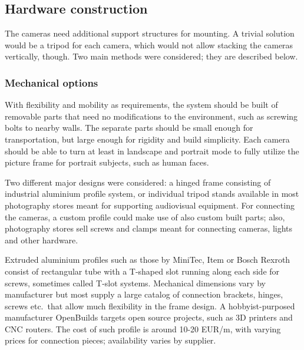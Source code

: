 

\subsection{Hardware construction} %

The cameras need additional support structures for mounting.
A trivial solution would be a tripod for each camera, which would not allow stacking the cameras vertically, though.
Two main methods were considered; they are described below.

\subsubsection{Mechanical options}

With flexibility and mobility as requirements, the system should be built of removable parts that need no modifications to the environment, such as screwing bolts to nearby walls.
The separate parts should be small enough for transportation, but large enough for rigidity and build simplicity.
Each camera should be able to turn at least in landscape and portrait mode to fully utilize the picture frame for portrait subjects, such as human faces.

Two different major designs were considered: a hinged frame consisting of industrial aluminium profile system, or individual tripod stands available in most photography stores meant for supporting audiovisual equipment.
For connecting the cameras, a custom profile could make use of also custom built parts; also, photography stores sell screws and clamps meant for connecting cameras, lights and other hardware.

Extruded aluminium profiles such as those by MiniTec, Item or Bosch Rexroth consist of rectangular tube with a T-shaped slot running along each side for screws, sometimes called T-slot systems.
Mechanical dimensions vary by manufacturer but most supply a large catalog of connection brackets, hinges, screws etc.\ that allow much flexibility in the frame design.
A hobbyist-purposed manufacturer OpenBuilds targets open source projects, such as 3D printers and CNC routers.
The cost of such profile is around 10-20 EUR/m, with varying prices for connection pieces; availability varies by supplier.


